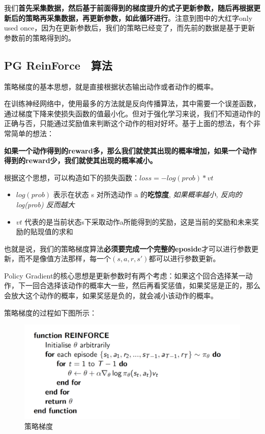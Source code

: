 \documentclass[UTF8,a4paper,12pt]{ctexbook}
\begin{document}
		我们\textbf{首先采集数据，然后基于前面得到的梯度提升的式子更新参数，随后再根据更新后的策略再采集数据，再更新参数，如此循环进行}。注意到图中的大红字only used once，因为在更新参数后，我们的策略已经变了，而先前的数据是基于更新参数前的策略得到的。

		\subsection{PG ReinForce　算法}
			策略梯度的基本思想，就是直接根据状态输出动作或者动作的概率。
			
			在训练神经网络中，使用最多的方法就是反向传播算法，其中需要一个误差函数，通过梯度下降来使损失函数的值最小化。但对于强化学习来说，我们不知道动作的正确与否，只能通过奖励值来判断这个动作的相对好坏。基于上面的想法，有个非常简单的想法：
			
			\textbf{如果一个动作得到的reward多，那么我们就使其出现的概率增加，如果一个动作得到的reward少，我们就使其出现的概率减小。}
			
			根据这个思想，可以构造如下的损失函数：$loss= -log(prob)*vt$
			
			\begin{itemize}
				\item $log(prob)$ 表示在状态 s 对所选动作 a 的\textbf{吃惊度}, \textit{如果概率越小, 反向的log(prob) 反而越大}
				\item $vt$ 代表的是当前状态s下采取动作a所能得到的奖励，这是当前的奖励和未来奖励的贴现值的求和
			\end{itemize}
		
			也就是说，我们的策略梯度算法\textbf{必须要完成一个完整的eposide}才可以进行参数更新，而不是像值方法那样，每一个$(s,a,r,s')$都可以进行参数更新。
			
			Policy Gradient的核心思想是更新参数时有两个考虑：如果这个回合选择某一动作，下一回合选择该动作的概率大一些，然后再看奖惩值，如果奖惩是正的，那么会放大这个动作的概率，如果奖惩是负的，就会减小该动作的概率。
			
			策略梯度的过程如下图所示：
			\begin{figure}[H]
				\centering
				\includegraphics[width=.8\linewidth]{PolicyGradient}
				\caption{策略梯度}
			\end{figure}
			
\end{document}
